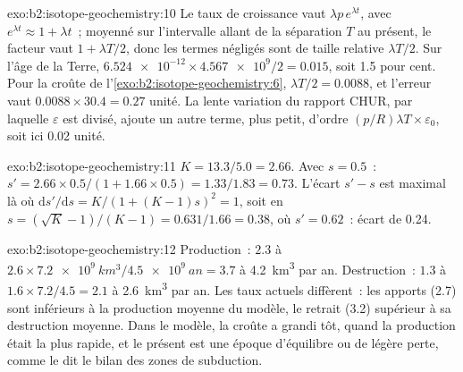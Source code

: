 \begin{solution}{exo:b2:isotope-geochemistry:10}
Le taux de croissance vaut $\lambda p\,e^{\lambda t}$, avec $e^{\lambda t} \approx 1 + \lambda t$~;
moyenné sur l'intervalle allant de la séparation $T$ au présent, le facteur vaut
$1 + \lambda T/2$, donc les termes négligés sont de taille relative $\lambda T/2$. Sur
l'âge de la Terre, $\num{6.524e-12}\times\num{4.567e9}/2 = 0.015$, soit 1.5 pour cent. Pour la
croûte de l'\cref{exo:b2:isotope-geochemistry:6}, $\lambda T/2 = 0.0088$, et l'erreur vaut $0.0088\times30.4 = 0.27$
unité. La lente variation du rapport CHUR, par laquelle $\varepsilon$ est divisé, ajoute
un autre terme, plus petit, d'ordre $(p/R)\lambda T \times \varepsilon_0$, soit ici 0.02 unité.
\end{solution}

\begin{solution}{exo:b2:isotope-geochemistry:11}
$K = 13.3/5.0 = 2.66$. Avec $s = 0.5$~: $s' = 2.66\times0.5/(1 + 1.66\times0.5) =
1.33/1.83 = 0.73$. L'écart $s' - s$ est maximal là où
$\mathrm{d}s'/\mathrm{d}s = K/(1+(K-1)s)^2 = 1$, soit en $s = (\sqrt K - 1)/(K-1) =
0.631/1.66 = 0.38$, où $s' = 0.62$~: écart de 0.24.
\end{solution}

\begin{solution}{exo:b2:isotope-geochemistry:12}
Production~: $2.3$ à $2.6\times\qty{7.2e9}{km^3}/\qty{4.5e9}{an} = 3.7$ à
\qty{4.2}{km^3} par an. Destruction~: $1.3$ à $1.6\times7.2/4.5 = 2.1$ à
\qty{2.6}{km^3} par an. Les taux actuels diffèrent~: les apports (2.7) sont inférieurs à la
production moyenne du modèle, le retrait (3.2) supérieur à sa destruction moyenne. Dans le modèle, la croûte a grandi
tôt, quand la production était la plus rapide, et le présent est une époque d'équilibre ou de légère
perte, comme le dit le bilan des zones de subduction.
\end{solution}

